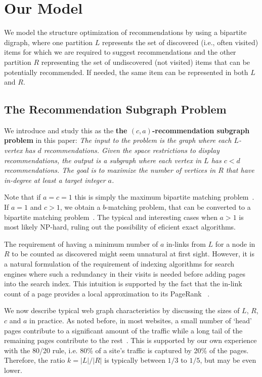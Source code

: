 \section{Our Model}
\label{modelsec}

We model the structure optimization of recommendations by using a bipartite
digraph, where one partition $L$ represents the set of discovered
(i.e., often visited) items for which we are required to suggest recommendations and the other partition $R$
representing the set of undiscovered (not visited) items that can be potentially recommended. If
needed, the same item can be represented in both $L$ and $R$.
 

\subsection{The Recommendation Subgraph Problem}
\label{recsub}
We introduce and study this as the {\bf the $(c, a)$-recommendation subgraph problem} in this paper:
{\em
 The input to the problem is the graph where each
$L$-vertex has $d$ recommendations. Given the space restrictions to
display recommendations, the output is a subgraph where each vertex in
$L$ has $c < d$ recommendations. The goal is to maximize the number of
vertices in $R$ that have in-degree at least a target integer $a$.
}

 

Note that if $a=c=1$ this is simply the maximum bipartite
matching problem~\cite{LovaszPlummer1986}. If $a=1$ and $c > 1$, we
obtain a $b$-matching problem, that can be converted to a bipartite
matching problem~\cite{Gabow1983}. The typical and interesting cases when $a > 1$ is most likely NP-hard, ruling out the possibility of eficient exact algorithms. 

The requirement of having a minimum number of $a$ in-links from $L$ for a node in $R$ to be counted as discovered might seem unnatural at first sight. However, it is a natural formulation of the requirement of indexing algorithms for search engines where such a redundancy in their  visits is needed before adding pages into the search index. This intuition is supported by the fact that the in-link count of a page provides a local approximation to its PageRank ~\cite{bar2008local}.  

We now describe typical web graph characteristics by discussing the
sizes of $L$, $R$, $c$ and $a$ in practice. As noted before, in most
websites, a small number of `head' pages contribute to a significant
amount of the traffic while a long tail of the remaining pages
contribute to the rest~\cite{HubermanAdamic1999,
  DuDemmerBrewer2006, KumarNorrisSun2009}. This is supported by our
own experience with the 80/20 rule, i.e. 80\% of a site's traffic is
captured by 20\% of the pages. Therefore, the ratio $k=|L|/|R|$ is
typically between $1/3$ to $1/5$, but may be even lower.  

